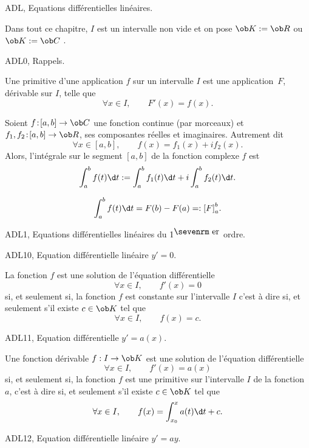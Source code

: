                                              






\Chapter ADL, Equations différentielles linéaires.
\bigskip

Dans tout ce chapitre, $I$ est un intervalle non vide  et on pose  $\ob K:=\ob R$ ou $\ob K:=\ob C$ . 
\bigskip

\Section ADL0, Rappels. 

\Definition []  Une primitive d'une application $f$ sur un intervalle $I$ est une application~$F$, dérivable sur $I$, telle que 
$$
\forall x\in I, \qquad F'(x)=f(x).
$$

\Definition []  Soient $f\!:\![a,b]\to\ob C$ une fonction continue (par morceaux) et $f_1,f_2\!:\![a,b]\to\ob R$, ses composantes réelles et imaginaires. Autrement dit 
$$
\forall x\in[a,b],\qquad f(x)=f_1(x)+if_2(x).
$$
Alors, l'intégrale sur le segment $[a,b]$ de la fonction complexe $f$ est 
$$
\int_a^bf(t)\d t:=\int_a^bf_1(t)\d t+i\int_a^bf_2(t)\d t.
$$

$$
\int_a^bf(t)\d t=F(b)-F(a)=:{[F]}_a^b.
$$

\Section ADL1, Equations différentielles linéaires du $1^{\mbox{\sevenrm er}}$ ordre.

\Subsection ADL10, Equation différentielle linéaire $y'=0$. 

La fonction $f$ est une solution de l'équation différentielle 
$$
\forall x\in I , \qquad  f'(x)=0 
$$
si, et seulement si, la fonction $f$ est constante sur l'intervalle $I$  c'est  à  dire  si,  et  seulement  s'il  existe
$c\in\ob K$  tel que $$ 
\forall x\in I , \qquad f(x)=c.
$$

\Subsection ADL11, Equation différentielle $y'=a(x)$. 

Une fonction dérivable  $f:I\to\ob K$  est une solution de l'équation différentielle 
$$
\forall x\in I , \qquad  f'(x)=a(x) 
$$
si, et seulement si, la fonction $f$ est une primitive sur l'intervalle $I$ de la fonction $a$, c'est à dire
si,  et seulement s'il existe $c\in\ob K$ tel que 
$$ 
\forall x\in I, \qquad f(x)=\int_{x_0}^xa(t)\d t+c. 
$$


\Subsection ADL12, Equation différentielle linéaire $y'=ay$. 

